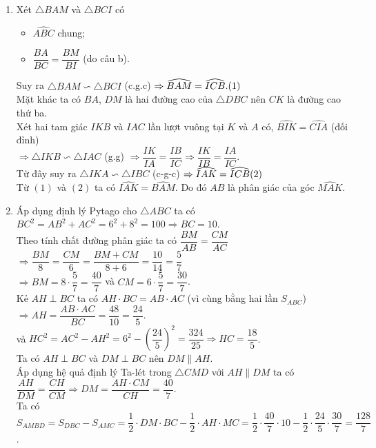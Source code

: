 \begin{ex}
{\begin{enumerate}
        \item Xét $\triangle BAM $ và $\triangle BCI$ có
        \begin{itemize}
        \item $\widehat{ABC}$ chung;
        \item $\dfrac{BA}{BC} = \dfrac{BM}{BI}$ (do câu b).
        \end{itemize}
        Suy ra $\triangle BAM \backsim \triangle BCI$ (c.g.c) $\Rightarrow \widehat{BAM} = \widehat{ICB}.\hfill (1)$\\
        Mặt khác ta có $BA$, $DM$ là hai đường cao của $\triangle DBC$ nên $CK$ là đường cao thứ ba.\\
        Xét hai tam giác $IKB$ và $IAC$ lần lượt vuông tại $K$ và $A$ có, $\widehat{BIK}=\widehat{CIA}$ (đối đỉnh)\\
        $\Rightarrow \triangle IKB \backsim \triangle IAC$ (g.g) $\Rightarrow \dfrac{IK}{IA} = \dfrac{IB}{IC} \Rightarrow \dfrac{IK}{IB} = \dfrac{IA}{IC}$.\\
        Từ đây suy ra $\triangle IKA \backsim \triangle IBC$ (c-g-c) $\Rightarrow \widehat{IAK} = \widehat{ICB}\hfill (2)$\\
        Từ $(1)$ và $(2)$ ta có $\widehat{IAK} = \widehat{BAM}$. Do đó $AB$ là phân giác của góc $\widehat{MAK}$.
        \item Áp dụng định lý Pytago cho $\triangle ABC$ ta có $BC^2 = AB^2 +AC^2 = 6^2 + 8^2 = 100 \Rightarrow BC = 10$.\\
        Theo tính chất đường phân giác ta có $\dfrac{BM}{AB} = \dfrac{CM}{AC}$\\
        $\Rightarrow \dfrac{BM}{8} = \dfrac{CM}{6} = \dfrac{BM + CM}{8+6} = \dfrac{10}{14} = \dfrac{5}{7}$\\
        $\Rightarrow BM =  8 \cdot \dfrac{5}{7} = \dfrac{40}{7}$ và $CM = 6 \cdot \dfrac{5}{7} = \dfrac{30}{7}$.\\
        Kẻ $AH \perp BC$ ta có $AH \cdot BC = AB \cdot AC$ (vì cùng bằng hai lần $S_{ABC}$)\\
        $\Rightarrow AH = \dfrac{AB \cdot AC}{BC} = \dfrac{48}{10} = \dfrac{24}{5}$.\\
        và $HC^2 = AC^2 - AH^2 = 6^2 - \left(\dfrac{24}{5}\right)^2 = \dfrac{324}{25} \Rightarrow HC = \dfrac{18}{5}$.\\
        Ta có $AH \perp BC$ và $DM \perp BC$ nên $DM \parallel AH$.\\
        Áp dụng hệ quả định lý Ta-lét trong $\triangle CMD$ với $AH \parallel DM$ ta có\\
        $\dfrac{AH}{DM} = \dfrac{CH}{CM} \Rightarrow DM = \dfrac{AH \cdot CM}{CH} = \dfrac{40}{7}$.\\
        Ta có $S_{AMBD} = S_{DBC} - S_{AMC} = \dfrac{1}{2}\cdot DM \cdot BC - \dfrac{1}{2}\cdot AH \cdot MC = \dfrac{1}{2} \cdot \dfrac{40}{7} \cdot 10 - \dfrac{1}{2} \cdot \dfrac{24}{5} \cdot \dfrac{30}{7} = \dfrac{128}{7}$.
    \end{enumerate}
    }
\end{ex}
